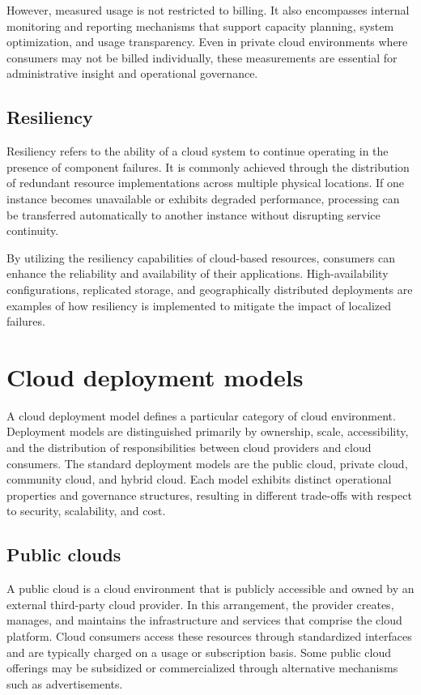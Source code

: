 \documentclass[11pt,a4paper,openany]{report}
\begin{document}
However, measured usage is not restricted to billing. It also encompasses internal monitoring and reporting mechanisms that support capacity planning, system optimization, and usage transparency. Even in private cloud environments where consumers may not be billed individually, these measurements are essential for administrative insight and operational governance.

\subsection{Resiliency}

Resiliency refers to the ability of a cloud system to continue operating in the presence of component failures. It is commonly achieved through the distribution of redundant resource implementations across multiple physical locations. If one instance becomes unavailable or exhibits degraded performance, processing can be transferred automatically to another instance without disrupting service continuity.

By utilizing the resiliency capabilities of cloud-based resources, consumers can enhance the reliability and availability of their applications. High-availability configurations, replicated storage, and geographically distributed deployments are examples of how resiliency is implemented to mitigate the impact of localized failures.

\section{Cloud deployment models}

A cloud deployment model defines a particular category of cloud environment. Deployment models are distinguished primarily by ownership, scale, accessibility, and the distribution of responsibilities between cloud providers and cloud consumers. The standard deployment models are the public cloud, private cloud, community cloud, and hybrid cloud. Each model exhibits distinct operational properties and governance structures, resulting in different trade-offs with respect to security, scalability, and cost.

\subsection{Public clouds}

A public cloud is a cloud environment that is publicly accessible and owned by an external third-party cloud provider. In this arrangement, the provider creates, manages, and maintains the infrastructure and services that comprise the cloud platform. Cloud consumers access these resources through standardized interfaces and are typically charged on a usage or subscription basis. Some public cloud offerings may be subsidized or commercialized through alternative mechanisms such as advertisements.
\end{document}
